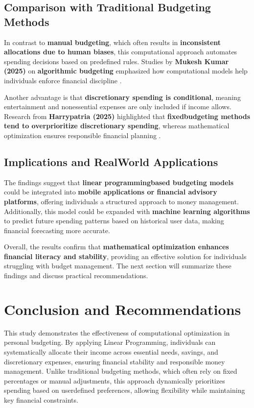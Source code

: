 \documentclass{article}
\begin{document}
\subsection{Comparison with Traditional Budgeting Methods}
In contrast to \textbf{manual budgeting}, which often results in \textbf{inconsistent allocations due to human biases}, this computational approach automates spending decisions based on predefined rules. Studies by \textbf{Mukesh Kumar (2025)} on \textbf{algorithmic budgeting} emphasized how computational models help individuals enforce financial discipline \cite{upgrad2025knapsack}.

Another advantage is that \textbf{discretionary spending is conditional}, meaning entertainment and nonessential expenses are only included if income allows. Research from \textbf{Harrypatria (2025)} highlighted that \textbf{fixedbudgeting methods tend to overprioritize discretionary spending}, whereas mathematical optimization ensures responsible financial planning \cite{harrypatria2025pulp}.

\subsection{Implications and RealWorld Applications}
The findings suggest that \textbf{linear programmingbased budgeting models} could be integrated into \textbf{mobile applications or financial advisory platforms}, offering individuals a structured approach to money management. Additionally, this model could be expanded with \textbf{machine learning algorithms} to predict future spending patterns based on historical user data, making financial forecasting more accurate.

Overall, the results confirm that \textbf{mathematical optimization enhances financial literacy and stability}, providing an effective solution for individuals struggling with budget management. The next section will summarize these findings and discuss practical recommendations.
\section{Conclusion and Recommendations}
This study demonstrates the effectiveness of computational optimization in personal budgeting. By applying Linear Programming, individuals can systematically allocate their income across essential needs, savings, and discretionary expenses, ensuring financial stability and responsible money management. Unlike traditional budgeting methods, which often rely on fixed percentages or manual adjustments, this approach dynamically prioritizes spending based on userdefined preferences, allowing flexibility while maintaining key financial constraints.
\end{document}
